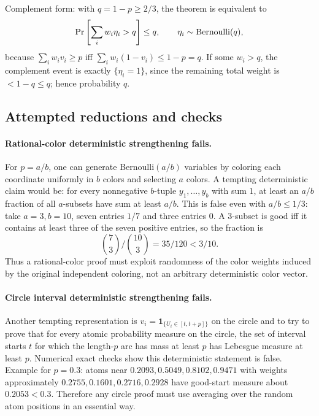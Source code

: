 \documentclass[12pt]{article}
\begin{document}
Complement form: with \(q=1-p\ge2/3\), the theorem is equivalent to
\[
 \Pr\left[\sum_i w_i \eta_i>q\right]\le q,\qquad
 \eta_i\sim{\rm Bernoulli}(q),
\]
because \(\sum_i w_i v_i\ge p\) iff \(\sum_i w_i(1-v_i)\le1-p=q\).
If some \(w_i>q\), the complement event is exactly \(\{\eta_i=1\}\), since
the remaining total weight is \(<1-q\le q\); hence probability \(q\).

\subsection*{Attempted reductions and checks}

\paragraph{Rational-color deterministic strengthening fails.}
For \(p=a/b\), one can generate Bernoulli\((a/b)\) variables by coloring each
coordinate uniformly in \(b\) colors and selecting \(a\) colors.  A tempting
deterministic claim would be: for every nonnegative \(b\)-tuple \(y_1,\ldots,y_b\)
with sum \(1\), at least an \(a/b\) fraction of all \(a\)-subsets have sum at
least \(a/b\).  This is false even with \(a/b\le1/3\): take \(a=3,b=10\),
seven entries \(1/7\) and three entries \(0\).  A 3-subset is good iff it contains
at least three of the seven positive entries, so the fraction is
\[
 \binom73/\binom{10}3=35/120<3/10.
\]
Thus a rational-color proof must exploit randomness of the color weights induced
by the original independent coloring, not an arbitrary deterministic color vector.

\paragraph{Circle interval deterministic strengthening fails.}
Another tempting representation is \(v_i=\mathbf1_{\{U_i\in[t,t+p]\}}\) on the
circle and to try to prove that for every atomic probability measure on the
circle, the set of interval starts \(t\) for which the length-\(p\) arc has
mass at least \(p\) has Lebesgue measure at least \(p\).  Numerical exact checks
show this deterministic statement is false.  Example for \(p=0.3\): atoms near
\(0.2093,0.5049,0.8102,0.9471\) with weights approximately
\(0.2755,0.1601,0.2716,0.2928\) have good-start measure about \(0.2053<0.3\).
Therefore any circle proof must use averaging over the random atom positions in
an essential way.
\end{document}
